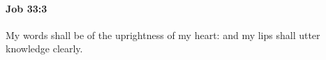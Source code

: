 
		\paragraph{Job 33:3} %
			\label{JOB-33-3}

			My words shall be of the uprightness of my heart: and my lips shall utter knowledge clearly.


